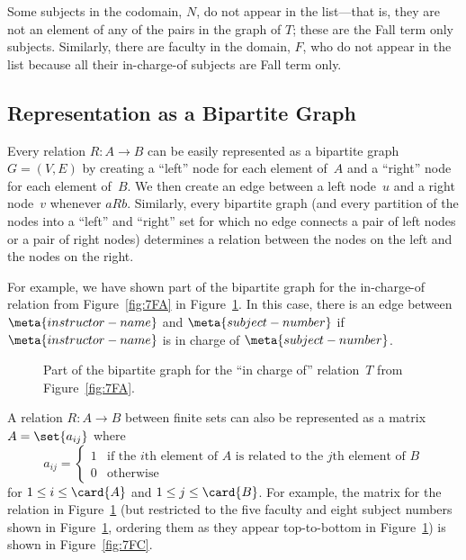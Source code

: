 Some subjects in the codomain, $N$, do not appear in the list---that
is, they are not an element of any of the pairs in the graph of $T$;
these are the Fall term only subjects.  Similarly, there are faculty
in the domain, $F$, who do not appear in the list because all their
in-charge-of subjects are Fall term only.

\subsection{Representation as a Bipartite Graph}

Every relation $R: A \to B$ can be easily represented as a bipartite
graph $G = (V, E)$ by creating a ``left'' node for each element of~$A$
and a ``right'' node for each element of~$B$.  We then create an edge
between a left node~$u$ and a right node~$v$ whenever $a R b$.
Similarly, every bipartite graph (and every partition of the nodes
into a ``left'' and ``right'' set for which no edge connects a pair of
left nodes or a pair of right nodes) determines a relation between the
nodes on the left and the nodes on the right.

For example, we have shown part of the bipartite graph for the
in-charge-of relation from Figure~\ref{fig:7FA} in
Figure~\ref{fig:7FB}.  In this case, there is an edge between
$\meta{instructor-name}$ and $\meta{subject-number}$ if
$\meta{instructor-name}$ is in charge of $\meta{subject-number}$.

\begin{figure}



\caption{Part of the bipartite graph for the ``in charge of''
  relation~$T$ from Figure~\ref{fig:7FA}.}

\label{fig:7FB}

\end{figure}

A relation $R: A \to B$ between finite sets can also be represented as
a matrix $A = \set{a_{ij}}$ where
\begin{equation*}
    a_{ij} = \begin{cases}
                1 & \text{if the $i$th element of~$A$ is related to
                          the $j$th element of~$B$} \\
                0 & \text{otherwise}
             \end{cases}
\end{equation*}
for $1 \le i \le \card{A}$ and $1 \le j \le \card{B}$.  For example,
the matrix for the relation in Figure~\ref{fig:7FB} (but restricted to
the five faculty and eight subject numbers shown in
Figure~\ref{fig:7FB}, ordering them as they appear top-to-bottom in
Figure~\ref{fig:7FB}) is shown in Figure~\ref{fig:7FC}.

